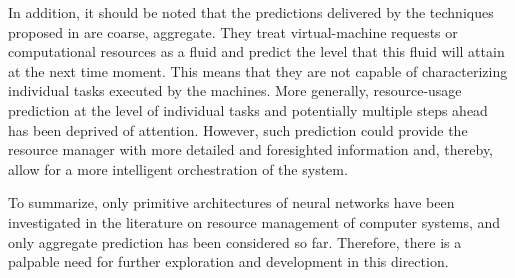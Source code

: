 In addition, it should be noted that the predictions delivered by the techniques
proposed in \cite{cao2014, dabbagh2015, ismaeel2015} are coarse, aggregate. They
treat virtual-machine requests or computational resources as a fluid and predict
the level that this fluid will attain at the next time moment. This means that
they are not capable of characterizing individual tasks executed by the
machines. More generally, resource-usage prediction at the level of individual
tasks and potentially multiple steps ahead has been deprived of attention.
However, such prediction could provide the resource manager with more detailed
and foresighted information and, thereby, allow for a more intelligent
orchestration of the system.

To summarize, only primitive architectures of neural networks have been
investigated in the literature on resource management of computer systems, and
only aggregate prediction has been considered so far. Therefore, there is a
palpable need for further exploration and development in this direction.
